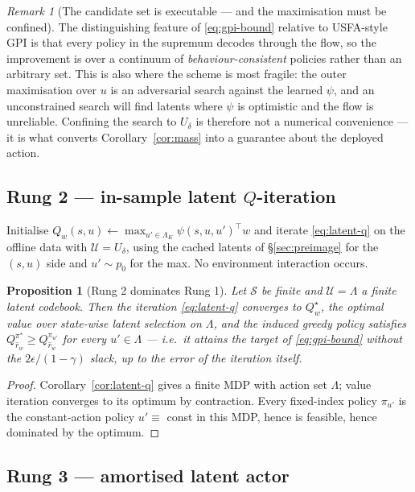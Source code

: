 \documentclass[11pt]{article}
\theoremstyle{plain}
\newtheorem{proposition}[lemma]{Proposition}
\theoremstyle{definition}
\theoremstyle{remark}
\newtheorem{remark}[lemma]{Remark}
\newcommand{\Sspace}{\mathcal S}
\newcommand{\1}{\mathbf 1}
\newcommand{\Udelta}{U_\delta}
\begin{document}
\begin{remark}[The candidate set is executable --- and the maximisation must be confined]
\label{rem:adversarial-u}
The distinguishing feature of \eqref{eq:gpi-bound} relative to USFA-style GPI is that every
policy in the supremum decodes through the flow, so the improvement is over a continuum of
\emph{behaviour-consistent} policies rather than an arbitrary set. This is also where the
scheme is most fragile: the outer maximisation over $u$ is an adversarial search against
the learned $\psi$, and an unconstrained search will find latents where $\psi$ is
optimistic and the flow is unreliable. Confining the search to $\Udelta$ is therefore not
a numerical convenience --- it is what converts Corollary~\ref{cor:mass} into a guarantee
about the deployed action.
\end{remark}

\subsection{Rung 2 --- in-sample latent \texorpdfstring{$Q$}{Q}-iteration}

Initialise $Q_w(s,u)\gets\max_{u'\in\Lambda_K}\psi(s,u,u')^\top w$ and iterate
\eqref{eq:latent-q} on the offline data with $\mathcal U=\Udelta$, using the cached latents
of \S\ref{sec:preimage} for the $(s,u)$ side and $u'\sim p_0$ for the max. No environment
interaction occurs.

\begin{proposition}[Rung 2 dominates Rung 1]
\label{prop:rung2}
Let $\Sspace$ be finite and $\mathcal U=\Lambda$ a finite latent codebook. Then the
iteration \eqref{eq:latent-q} converges to $Q^\star_w$, the optimal value over state-wise
latent selection on $\Lambda$, and the induced greedy policy satisfies
$Q^{\pi^\star}_{\hat r_w}\ge Q^{\pi_{u'}}_{\hat r_w}$ for every $u'\in\Lambda$ --- i.e.\ it
attains the target of \eqref{eq:gpi-bound} without the $2\epsilon/(1-\gamma)$ slack, up to
the error of the iteration itself.
\end{proposition}

\begin{proof}
Corollary~\ref{cor:latent-q} gives a finite MDP with action set $\Lambda$; value iteration
converges to its optimum by contraction. Every fixed-index policy $\pi_{u'}$ is the
constant-action policy $u'\equiv$ const in this MDP, hence is feasible, hence dominated by
the optimum.
\end{proof}

\subsection{Rung 3 --- amortised latent actor}
\end{document}
